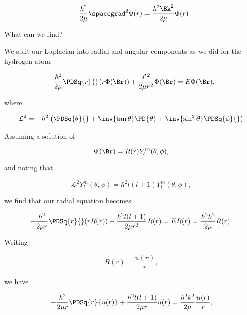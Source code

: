 \begin{equation}\label{eqn:qmTwoL23:60}
- \frac{\hbar^2}{2\mu} \spacegrad^2 
\Phi(r)
 = \frac{\hbar^2 \Bk^2}{2 \mu} 
\Phi(r)
\end{equation}

What can we find?

We split our Laplacian into radial and angular components as we did for the hydrogen atom

\begin{equation}\label{eqn:qmTwoL23:80}
- \frac{\hbar^2}{2\mu} \PDSq{r}{} (r \Phi(\Br)) +
\frac{\mathcal{L}^2}{2 \mu r^2} 
\Phi(\Br)
= 
E \Phi(\Br),
\end{equation}

where 

\begin{equation}\label{eqn:qmTwoL23:100}
\mathcal{L}^2 = -\hbar^2 \left(
\PDSq{\theta}{}
+ \inv{\tan\theta} \PD{\theta}
+ \inv{\sin^2\theta} \PDSq{\phi}{}
\right)
\end{equation}

Assuming a solution of

\begin{equation}\label{eqn:qmTwoL23:120}
\Phi(\Br) = R(r) Y_l^m(\theta, \phi),
\end{equation}

and noting that

\begin{equation}\label{eqn:qmTwoL23:140}
\mathcal{L}^2 Y_l^m(\theta, \phi) = \hbar^2 l (l+1) Y_l^m(\theta, \phi),
\end{equation}

we find that our radial equation becomes

\begin{equation}\label{eqn:qmTwoL23:160}
- \frac{\hbar^2}{2 \mu r} \PDSq{r}{} (r R(r))
+\frac{\hbar^2 l (l+1) 
}{2 \mu r^2} 
R(r)
= 
E R(r)
= 
\frac{\hbar^2 k^2}{2\mu} R(r).
\end{equation}

Writing

\begin{equation}\label{eqn:qmTwoL23:180}
R(r) = \frac{u(r)}{r},
\end{equation}

we have

\begin{equation}\label{eqn:qmTwoL23:200}
- \frac{\hbar^2}{2 \mu r} \PDSq{r}{u(r)} 
+\frac{\hbar^2 l (l+1) 
}{2 \mu r} 
u(r)
= 
\frac{\hbar^2 k^2}{2\mu} 
 \frac{u(r)}{r},
\end{equation}

